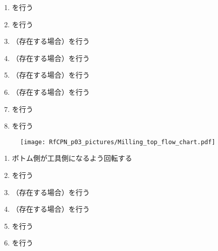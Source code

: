 \clearpage
\begin{enumerate}[label*=\sarrow]
\item \DimpleMilling を行う
\item \TopEndFacecutMilling を行う
\item （存在する場合）\TopOutcutMilling を行う
\item （存在する場合）\TopCurvedOutcutMilling を行う
\item （存在する場合）\EndFaceBoringMilling を行う
\item （存在する場合）\IncutBoringMilling を行う
\item \TopEndFaceOutCChamferMilling を行う
\item \TopEndFaceInCChamferMilling を行う
\end{enumerate}


\begin{figure}[ht]%
\begin{Figbox}[valign=top]%
\texttt{[image: RfCPN\_p03\_pictures/Milling\_top\_flow\_chart.pdf]}%
\setlength{\abovecaptionskip}{10pt}%
%
\end{Figbox}%
\end{figure}%



\begin{enumerate}[label*=\sarrow]
\item ボトム側が工具側になるよう回転する
\item \BottomEndFacecutMilling を行う
\item （存在する場合）\BottomOutcutMilling を行う
\item （存在する場合）\BottomCurvedOutcutMilling を行う
\item \BottomEndFaceOutCChamferMilling を行う
\item \BottomEndFaceInCChamferMilling を行う
\end{enumerate}


